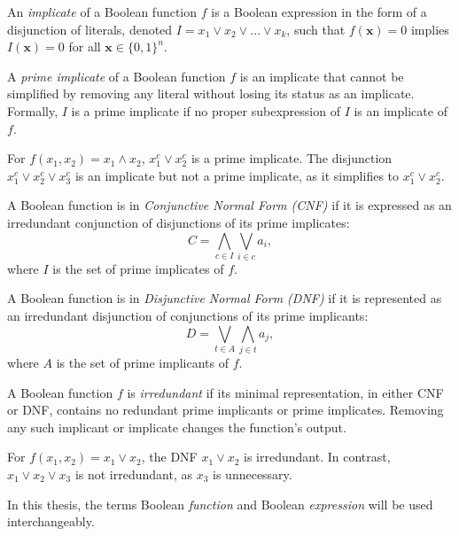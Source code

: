 \begin{definition}
An \emph{implicate} of a Boolean function $f$ is a Boolean expression in the form of a disjunction of literals, denoted $I=x_1\vee x_2\vee\dots\vee x_k$, such that $f(\mathbf{x})=0$ implies $I(\mathbf{x})=0$ for all $\mathbf{x}\in\{0,1\}^n$.
\end{definition}

\begin{definition}
A \emph{prime implicate} of a Boolean function $f$ is an implicate that cannot be simplified by removing any literal without losing its status as an implicate. Formally, $I$ is a prime implicate if no proper subexpression of $I$ is an implicate of $f$.
\end{definition}

\begin{example}
For $f(x_1,x_2)=x_1\wedge x_2$, $x_1^c\vee x_2^c$ is a prime implicate. The disjunction $x_1^c\vee x_2^c\vee x_3^c$ is an implicate but not a prime implicate, as it simplifies to $x_1^c\vee x_2^c$.
\end{example}

\begin{definition}
A Boolean function is in \emph{Conjunctive Normal Form (CNF)} if it is expressed as an irredundant conjunction of disjunctions of its prime implicates:
\[
C=\bigwedge_{c\in I}\bigvee_{i\in c}a_i,
\]
where $I$ is the set of prime implicates of $f$.
\end{definition}

\begin{definition}
A Boolean function is in \emph{Disjunctive Normal Form (DNF)} if it is represented as an irredundant disjunction of conjunctions of its prime implicants:
\[
D=\bigvee_{t\in A}\bigwedge_{j\in t}a_j,
\]
where $A$ is the set of prime implicants of $f$.
\end{definition}

\begin{definition}
A Boolean function $f$ is \emph{irredundant} if its minimal representation, in either CNF or DNF, contains no redundant prime implicants or prime implicates. Removing any such implicant or implicate changes the function's output.
\end{definition}

\begin{example}
For $f(x_1,x_2)=x_1\vee x_2$, the DNF $x_1\vee x_2$ is irredundant. In contrast, $x_1\vee x_2\vee x_3$ is not irredundant, as $x_3$ is unnecessary.
\end{example}
\noindent In this thesis, the terms Boolean \emph{function} and Boolean \emph{expression} will be used interchangeably.

